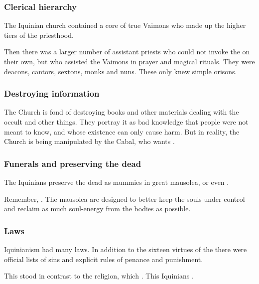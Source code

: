 \subsubsection{Clerical hierarchy}
The Iquinian church contained a core of true Vaimons who made up the higher tiers of the priesthood.

Then there was a larger number of assistant priests who could not invoke the \sephiroth on their own, but who assisted the Vaimons in prayer and magical rituals.
They were deacons, cantors, sextons, monks and nuns. 
These only knew simple orisons.





\subsubsection{Destroying information}
The Church is fond of destroying books and other materials dealing with the occult and other  things. They portray it as bad knowledge that people were not meant to know, and whose existence can only cause harm. But in reality, the Church is being manipulated by the Cabal, who wants .





\subsubsection{Funerals and preserving the dead}
The Iquinians preserve the dead as mummies in great mausolea, or even . 

Remember, . 
The mausolea are designed to better keep the souls under control and reclaim as much soul-energy from the bodies as possible. 





\subsubsection{Laws}
Iquinianism had many laws. 
In addition to the sixteen virtues of the \sephiroth there were official lists of sins and explicit rules of penance and punishment. 

This stood in contrast to the \Ortaican religion, which . 
This Iquinians . 

